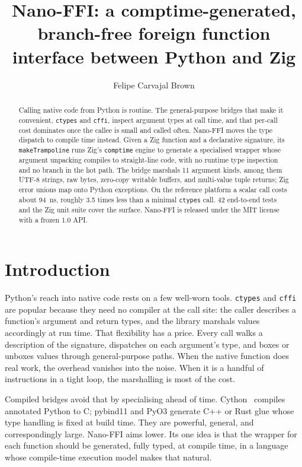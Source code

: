 \documentclass{jot}
\title{Nano-FFI: a comptime-generated, branch-free foreign function interface between Python and Zig}
\author[affiliation=ir, nowrap]
    {Felipe Carvajal Brown}
    {holds an M.Sc. in Numerical Simulation in Engineering (Universidad Polit\'ecnica de Madrid, Spain) and works as an independent researcher in Santiago, Chile. Contact him at \email{fcarvajalbrown@gmail.com}.}
\affiliation{ir}{Independent Researcher, Santiago, Chile}
\begin{document}
\begin{abstract}
Calling native code from Python is routine. The general-purpose bridges that make it convenient, \texttt{ctypes} and \texttt{cffi}, inspect argument types at call time, and that per-call cost dominates once the callee is small and called often. Nano-FFI moves the type dispatch to compile time instead. Given a Zig function and a declarative signature, its \texttt{makeTrampoline} runs Zig's \texttt{comptime} engine to generate a specialised wrapper whose argument unpacking compiles to straight-line code, with no runtime type inspection and no branch in the hot path. The bridge marshals 11 argument kinds, among them UTF-8 strings, raw bytes, zero-copy writable buffers, and multi-value tuple returns; Zig error unions map onto Python exceptions. On the reference platform a scalar call costs about 94~ns, roughly 3.5 times less than a minimal \texttt{ctypes} call. 42 end-to-end tests and the Zig unit suite cover the surface. Nano-FFI is released under the MIT license with a frozen 1.0 API.
\end{abstract}


\section{Introduction}

Python's reach into native code rests on a few well-worn tools. \texttt{ctypes} and \texttt{cffi} are popular because they need no compiler at the call site: the caller describes a function's argument and return types, and the library marshals values accordingly at run time. That flexibility has a price. Every call walks a description of the signature, dispatches on each argument's type, and boxes or unboxes values through general-purpose paths. When the native function does real work, the overhead vanishes into the noise. When it is a handful of instructions in a tight loop, the marshalling is most of the cost.

Compiled bridges avoid that by specialising ahead of time. Cython~\cite{cython} compiles annotated Python to C; pybind11 and PyO3 generate C++ or Rust glue whose type handling is fixed at build time. They are powerful, general, and correspondingly large. Nano-FFI aims lower. Its one idea is that the wrapper for each function should be generated, fully typed, at compile time, in a language whose compile-time execution model makes that natural.
\end{document}
